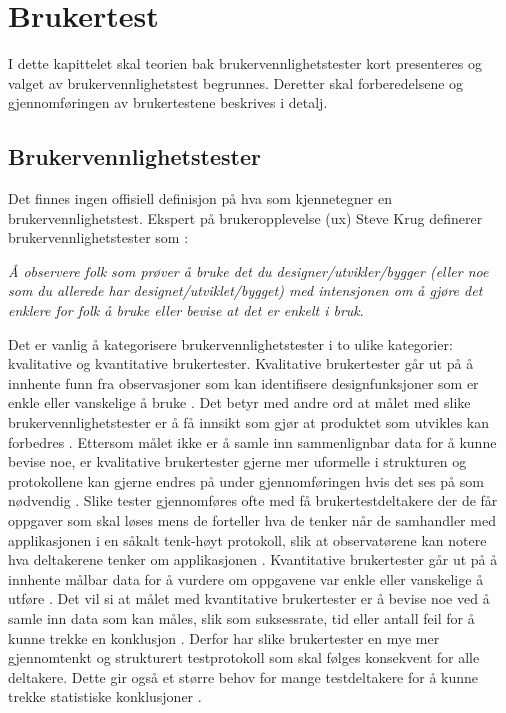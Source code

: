 \chapter{Brukertest}
I dette kapittelet skal teorien bak brukervennlighetstester kort presenteres og valget av brukervennlighetstest begrunnes. Deretter skal forberedelsene og gjennomføringen av brukertestene beskrives i detalj. 

\section{Brukervennlighetstester}
Det finnes ingen offisiell definisjon på hva som kjennetegner en brukervennlighetstest. Ekspert på brukeropplevelse (\acrshort{ux}) Steve Krug definerer brukervennlighetstester som \cite[~s.13]{krugRocketSurgeryMade2010}: 
\begin{displayquote}
\textit{Å observere folk som prøver å bruke det du designer/utvikler/bygger (eller noe som du allerede har designet/utviklet/bygget) med intensjonen om å gjøre det enklere for folk å bruke eller bevise at det er enkelt i bruk}.
\end{displayquote}
Det er vanlig å kategorisere brukervennlighetstester i to ulike kategorier: kvalitative og kvantitative brukertester. 
\newline
\newline
Kvalitative brukertester går ut på å innhente funn fra observasjoner som kan identifisere designfunksjoner som er enkle eller vanskelige å bruke \cite{budiuQuantitativeVsQualitative2017}. Det betyr med andre ord at målet med slike brukervennlighetstester er å få innsikt som gjør at produktet som utvikles kan forbedres \cite[~s.14]{krugRocketSurgeryMade2010}. Ettersom målet ikke er å samle inn sammenlignbar data for å kunne bevise noe, er kvalitative brukertester gjerne mer uformelle i strukturen og protokollene kan gjerne endres på under gjennomføringen hvis det ses på som nødvendig \cite[~s.14]{krugRocketSurgeryMade2010}. Slike tester gjennomføres ofte med få brukertestdeltakere der de får oppgaver som skal løses mens de forteller hva de tenker når de samhandler med applikasjonen i en såkalt tenk-høyt protokoll, slik at observatørene kan notere hva deltakerene tenker om applikasjonen \cite{HvaErThink}. 
\newline
\newline
Kvantitative brukertester går ut på å innhente målbar data for å vurdere om oppgavene var enkle eller vanskelige å utføre \cite{budiuQuantitativeVsQualitative2017}. Det vil si at målet med kvantitative brukertester er å bevise noe ved å samle inn data som kan måles, slik som suksessrate, tid eller antall feil for å kunne trekke en konklusjon \cite[~s.13]{krugRocketSurgeryMade2010} \cite{budiuQuantitativeVsQualitative2017}. Derfor har slike brukertester en mye mer gjennomtenkt og strukturert testprotokoll som skal følges konsekvent for alle deltakere. Dette gir også et større behov for mange testdeltakere for å kunne trekke statistiske konklusjoner \cite[~s.13]{krugRocketSurgeryMade2010} .
